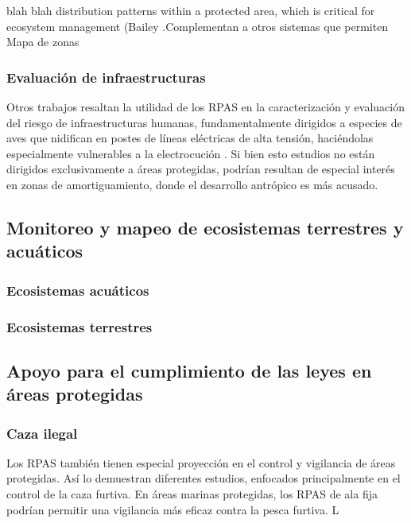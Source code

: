 \documentclass[11pt,]{article}
\begin{document}
\citep{PazmanyMulero2015} blah blah distribution patterns within a
protected area, which is critical for ecosystem management (Bailey
.Complementan a otros sistemas que permiten Mapa de zonas

\subsubsection{Evaluación de
infraestructuras}\label{evaluacion-de-infraestructuras}

Otros trabajos resaltan la utilidad de los RPAS en la caracterización y
evaluación del riesgo de infraestructuras humanas, fundamentalmente
dirigidos a especies de aves que nidifican en postes de líneas
eléctricas de alta tensión, haciéndolas especialmente vulnerables a la
electrocución \citep{Mulero-Pazmany2014a}. Si bien esto estudios no
están dirigidos exclusivamente a áreas protegidas, podrían resultan de
especial interés en zonas de amortiguamiento, donde el desarrollo
antrópico es más acusado.

\subsection{Monitoreo y mapeo de ecosistemas terrestres y
acuáticos}\label{monitoreo-y-mapeo-de-ecosistemas-terrestres-y-acuaticos}

\subsubsection{Ecosistemas acuáticos}\label{ecosistemas-acuaticos}

\subsubsection{Ecosistemas terrestres}\label{ecosistemas-terrestres}

\subsection{Apoyo para el cumplimiento de las leyes en áreas
protegidas}\label{apoyo-para-el-cumplimiento-de-las-leyes-en-areas-protegidas}

\subsubsection{Caza ilegal}\label{caza-ilegal}

Los RPAS también tienen especial proyección en el control y vigilancia
de áreas protegidas. Así lo demuestran diferentes estudios, enfocados
principalmente en el control de la caza furtiva. En áreas marinas
protegidas, los RPAS de ala fija podrían permitir una vigilancia más
eficaz contra la pesca furtiva. L
\end{document}
